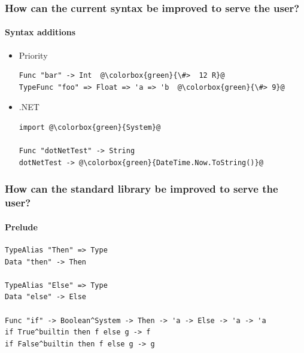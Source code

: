 \documentclass[xetex,serif]{beamer}
\begin{document}
\begin{frame}[fragile]
   \frametitle{How can the current syntax be improved to serve the user?}
   \framesubtitle{Syntax additions}

   \begin{itemize}
      \item Priority
         \begin{lstlisting}[escapechar=@]
Func "bar" -> Int  @\colorbox{green}{\#>  12 R}@
TypeFunc "foo" => Float => 'a => 'b  @\colorbox{green}{\#> 9}@
         \end{lstlisting}

      \item .NET
         \begin{lstlisting}[escapechar=@]
import @\colorbox{green}{System}@

Func "dotNetTest" -> String
dotNetTest -> @\colorbox{green}{DateTime.Now.ToString()}@
         \end{lstlisting}
   \end{itemize}
\end{frame}


\begin{frame}[fragile]
   \frametitle{How can the standard library be improved to serve the user?}
   \framesubtitle{Prelude}
   \begin{lstlisting}
TypeAlias "Then" => Type
Data "then" -> Then

TypeAlias "Else" => Type
Data "else" -> Else

Func "if" -> Boolean^System -> Then -> 'a -> Else -> 'a -> 'a
if True^builtin then f else g -> f
if False^builtin then f else g -> g
   \end{lstlisting}
\end{frame}

\end{document}
